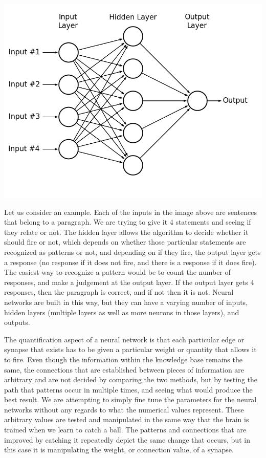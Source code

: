 \documentclass[11pt, oneside]{article}
\begin{document}
\includegraphics[scale=0.5]{fig_neural_network_1.png}

\par Let us consider an example. Each of the inputs in the image above are sentences that belong to a paragraph. We are trying to give it 4 statements and seeing if they relate or not. The hidden layer allows the algorithm to decide whether it should fire or not, which depends on whether those particular statements are recognized as patterns or not, and depending on if they fire, the output layer gets a response (no response if it does not fire, and there is a response if it does fire). The easiest way to recognize a pattern would be to count the number of responses, and make a judgement at the output layer. If the output layer gets 4 responses, then the paragraph is correct, and if not then it is not. Neural networks are built in this way, but they can have a varying number of inputs, hidden layers (multiple layers as well as more neurons in those layers), and outputs. 

\par The quantification aspect of a neural network is that each particular edge or synapse that exists has to be given a particular weight or quantity that allows it to fire. Even though the information within the knowledge base remains the same, the connections that are established between pieces of information are arbitrary and are not decided by comparing the two methods, but by testing the path that patterns occur in multiple times, and seeing what would produce the best result. We are attempting to simply fine tune the parameters for the neural networks without any regards to what the numerical values represent. These arbitrary values are tested and manipulated in the same way that the brain is trained when we learn to catch a ball. The patterns and connections that are improved by catching it repeatedly depict the same change that occurs, but in this case it is manipulating the weight, or connection value, of a synapse. 
\end{document}
